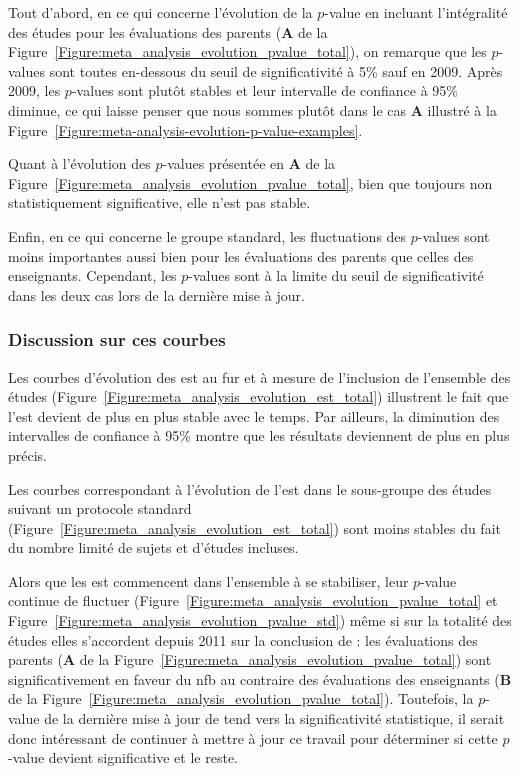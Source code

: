 Tout d'abord, en ce qui concerne l'évolution de la $p$-value en incluant l'intégralité des études pour les 
évaluations des parents (\textbf{A} de la Figure~\ref{Figure:meta_analysis_evolution_pvalue_total}), on remarque que les $p$-values sont toutes
en-dessous du seuil de significativité à 5\% sauf en 2009. Après 2009, les $p$-values sont plutôt stables et leur intervalle de confiance à 95\% diminue, ce qui laisse 
penser que nous sommes plutôt dans le cas \textbf{A} illustré à la Figure~\ref{Figure:meta-analysis-evolution-p-value-examples}.

Quant à l'évolution des $p$-values présentée en \textbf{A} de la Figure~\ref{Figure:meta_analysis_evolution_pvalue_total}, bien que toujours non statistiquement significative, 
elle n'est pas stable.

Enfin, en ce qui concerne le groupe standard, les fluctuations des $p$-values sont moins importantes aussi bien pour les évaluations des parents que celles des enseignants. 
Cependant, les $p$-values sont à la limite du seuil de significativité dans les deux cas lors de la dernière mise à jour.

\subsubsection{Discussion sur ces courbes}

Les courbes d'évolution des \gls{est} au fur et à mesure de l'inclusion de l'ensemble des études (Figure~\ref{Figure:meta_analysis_evolution_est_total}) illustrent le fait que l'\gls{est} 
devient de plus en plus stable avec le temps. Par ailleurs, la diminution des intervalles de confiance à 95\% montre que les résultats deviennent de plus en plus précis.

Les courbes correspondant à l'évolution de l'\gls{est} dans le sous-groupe des études suivant un protocole standard (Figure~\ref{Figure:meta_analysis_evolution_est_total}) sont moins stables 
du fait du nombre limité de sujets et d'études incluses.

Alors que les \gls{est} commencent dans l'ensemble à se stabiliser, leur $p$-value continue de fluctuer (Figure~\ref{Figure:meta_analysis_evolution_pvalue_total} et 
Figure~\ref{Figure:meta_analysis_evolution_pvalue_std}) même si sur la totalité des études elles s'accordent depuis 2011 sur la conclusion de \citet{Cortese2016} :
les évaluations des parents (\textbf{A} de la Figure~\ref{Figure:meta_analysis_evolution_pvalue_total}) sont significativement en faveur du \gls{nfb} 
au contraire des évaluations des enseignants (\textbf{B} de la Figure~\ref{Figure:meta_analysis_evolution_pvalue_total}). 
Toutefois, la $p$-value de la dernière mise à jour de \citet{Cortese2016} tend vers la significativité statistique, il serait donc intéressant de continuer à mettre à jour ce travail pour déterminer si 
cette $p$-value devient significative et le reste.

